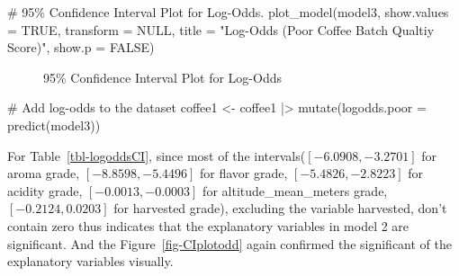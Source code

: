 \documentclass[
  letterpaper,
  DIV=11,
  numbers=noendperiod]{scrartcl}
\newenvironment{Shaded}{\begin{snugshade}}{\end{snugshade}}
\newcommand{\AttributeTok}[1]{\textcolor[rgb]{0.40,0.45,0.13}{#1}}
\newcommand{\CommentTok}[1]{\textcolor[rgb]{0.37,0.37,0.37}{#1}}
\newcommand{\ConstantTok}[1]{\textcolor[rgb]{0.56,0.35,0.01}{#1}}
\newcommand{\FunctionTok}[1]{\textcolor[rgb]{0.28,0.35,0.67}{#1}}
\newcommand{\NormalTok}[1]{\textcolor[rgb]{0.00,0.23,0.31}{#1}}
\newcommand{\OtherTok}[1]{\textcolor[rgb]{0.00,0.23,0.31}{#1}}
\newcommand{\SpecialCharTok}[1]{\textcolor[rgb]{0.37,0.37,0.37}{#1}}
\newcommand{\StringTok}[1]{\textcolor[rgb]{0.13,0.47,0.30}{#1}}
\begin{document}
\begin{Shaded}
\begin{Highlighting}[]
\CommentTok{\# 95\% Confidence Interval Plot for Log{-}Odds.}
\FunctionTok{plot\_model}\NormalTok{(model3, }\AttributeTok{show.values =} \ConstantTok{TRUE}\NormalTok{, }\AttributeTok{transform =} \ConstantTok{NULL}\NormalTok{,}
           \AttributeTok{title =} \StringTok{"Log{-}Odds (Poor Coffee Batch Qualtiy Score)"}\NormalTok{, }\AttributeTok{show.p =} \ConstantTok{FALSE}\NormalTok{)}
\end{Highlighting}
\end{Shaded}

\begin{figure}[H]


\caption{\label{fig-CIplot}95\% Confidence Interval Plot for Log-Odds}

\end{figure}%

\begin{Shaded}
\begin{Highlighting}[]
\CommentTok{\# Add log{-}odds to the dataset}
\NormalTok{coffee1 }\OtherTok{\textless{}{-}}\NormalTok{ coffee1 }\SpecialCharTok{|\textgreater{}}
  \FunctionTok{mutate}\NormalTok{(}\AttributeTok{logodds.poor =} \FunctionTok{predict}\NormalTok{(model3))}
\end{Highlighting}
\end{Shaded}

For Table~\ref{tbl-logoddsCI}, since most of the
intervals(\([-6.0908,-3.2701]\) for aroma grade, \([-8.8598,-5.4496]\)
for flavor grade, \([-5.4826,-2.8223]\) for acidity grade,
\([-0.0013,-0.0003]\) for altitude\_mean\_meters grade,
\([-0.2124,0.0203]\) for harvested grade), excluding the variable
harvested, don't contain zero thus indicates that the explanatory
variables in model 2 are significant. And the Figure~\ref{fig-CIplotodd}
again confirmed the significant of the explanatory variables visually.
\end{document}
